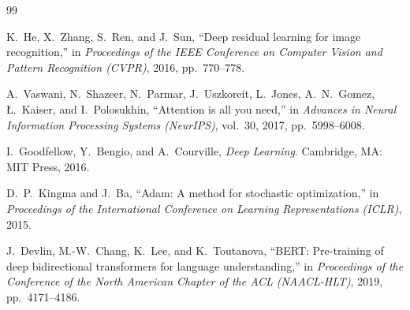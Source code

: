 \newpage

\begin{thebibliography}{99}

K.~He, X.~Zhang, S.~Ren, and J.~Sun,
``Deep residual learning for image recognition,''
in \emph{Proceedings of the IEEE Conference on Computer Vision and
Pattern Recognition (CVPR)}, 2016, pp.~770--778.

A.~Vaswani, N.~Shazeer, N.~Parmar, J.~Uszkoreit, L.~Jones,
A.~N.~Gomez, {\L}.~Kaiser, and I.~Polosukhin,
``Attention is all you need,''
in \emph{Advances in Neural Information Processing Systems (NeurIPS)},
vol.~30, 2017, pp.~5998--6008.

I.~Goodfellow, Y.~Bengio, and A.~Courville,
\emph{Deep Learning}.
Cambridge, MA: MIT Press, 2016.

D.~P.~Kingma and J.~Ba,
``Adam: A method for stochastic optimization,''
in \emph{Proceedings of the International Conference on Learning
Representations (ICLR)}, 2015.

J.~Devlin, M.-W.~Chang, K.~Lee, and K.~Toutanova,
``BERT: Pre-training of deep bidirectional transformers for language
understanding,''
in \emph{Proceedings of the Conference of the North American Chapter of
the ACL (NAACL-HLT)}, 2019, pp.~4171--4186.

\end{thebibliography}
